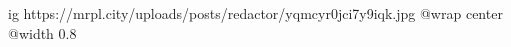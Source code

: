  
 
 
 
 

\ifcmt
  ig https://mrpl.city/uploads/posts/redactor/yqmcyr0jci7y9iqk.jpg
  @wrap center
  @width 0.8
\fi
